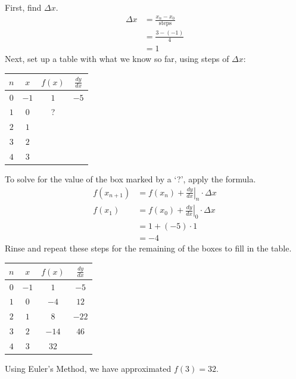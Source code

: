 \documentclass[12pt]{article}
\begin{document}
            \noindent First, find $\Delta x$.
            \begin{align*}
                \Delta x &= \frac{x_n - x_0}{\text{steps}} \\[6pt]
                &= \frac{3-(-1)}{4} \\[6pt]
                &= 1
            \end{align*}
            Next, set up a table with what we know so far, using steps of $\Delta x$:
            \begin{center}
                \begin{tabular}{|c|c|c|c|}
                    \hline
                    $n$ & $x$ & $f(x)$ & $\frac{dy}{dx}$ \\
                    \hline \hline
                    $0$ & $-1$ & $1$ & $-5$ \\
                    \hline
                    $1$ & $0$ & ? & \\
                    \hline
                    $2$ & $1$ & & \\
                    \hline
                    $3$ & $2$ & & \\
                    \hline
                    $4$ & $3$ & & \\
                    \hline
                \end{tabular}
            \end{center}
            To solve for the value of the box marked by a `?', apply the formula.
            \begin{align*}
                f(x_{n+1}) &= f(x_n) + \left. \frac{dy}{dx} \right \vert_n \cdot \Delta x \\[6pt]
                f(x_1) &= f(x_0) + \left. \frac{dy}{dx} \right \vert_0 \cdot \Delta x \\[6pt]
                &= 1 + (-5) \cdot 1 \\
                &= -4
            \end{align*}
            Rinse and repeat these steps for the remaining of the boxes to fill in the table.
            \begin{center}
                \begin{tabular}{|c|c|c|c|}
                    \hline
                    $n$ & $x$ & $f(x)$ & $\frac{dy}{dx}$ \\
                    \hline \hline
                    $0$ & $-1$ & $1$ & $-5$ \\
                    \hline
                    $1$ & $0$ & $-4$ & $12$ \\
                    \hline
                    $2$ & $1$ & $8$ & $-22$ \\
                    \hline
                    $3$ & $2$ & $-14$ & $46$ \\
                    \hline
                    $4$ & $3$ & $32$ & \\
                    \hline
                \end{tabular}
            \end{center}
            Using Euler's Method, we have approximated $f(3) = 32$.
\end{document}
